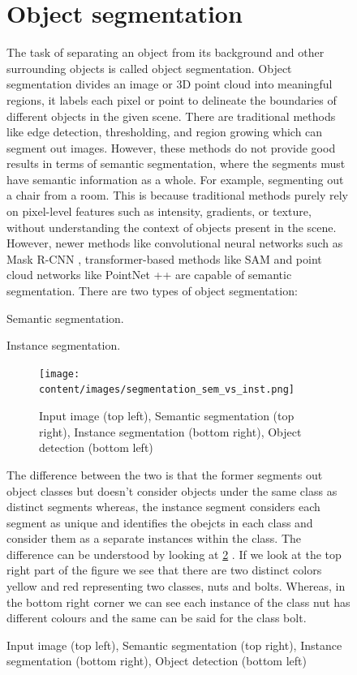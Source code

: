 \begin{figure}[ht!]
\section{Object segmentation}
The task of separating an object from its background and other surrounding objects is called object segmentation. Object segmentation divides an image or 3D point cloud
 into meaningful regions, it labels each pixel or point to delineate the boundaries of different objects in the given scene. There are traditional methods like edge detection, 
 thresholding, and region growing which can segment out images. However, these methods do not provide good results in terms of semantic segmentation, where the segments must 
 have semantic information as a whole. For example, segmenting out a chair from a room. This is because traditional methods purely rely on 
 pixel-level features such as intensity, gradients, or texture, without understanding the context of objects present in the scene. However, newer methods like convolutional
 neural networks such as Mask R-CNN \cite{he2018maskrcnn}, transformer-based methods like SAM and point cloud networks like PointNet ++ are capable of semantic segmentation. 
 There are two types of object segmentation:
 \begin{compactenum}[1.]
    \item	Semantic segmentation.
    \item	Instance segmentation.
 \end{compactenum}
\begin{figure}[ht!]
    \centering
    \texttt{[image: content/images/segmentation\_sem\_vs\_inst.png]}
    \caption{Input image (top left), Semantic segmentation (top right), Instance segmentation (bottom right), Object detection (bottom left)}
    \label{fig:segmentation_sem_vs_inst}
\end{figure}
The difference between the two is that the former segments out object classes but doesn't consider objects under the same class as distinct segments whereas, the instance segment 
considers each segment as unique and identifies the obejcts in each class and consider them as a separate instances within the class. The difference can be understood by looking at 
\cref{fig:segmentation_sem_vs_inst} \cite{Sharma2022}. If we look at the top right part of the figure we see that there are two distinct colors yellow and red representing two
classes, nuts and bolts. Whereas, in the bottom right corner we can see each instance of the class nut has different colours and the same can be said for the class bolt.

\end{figure}
